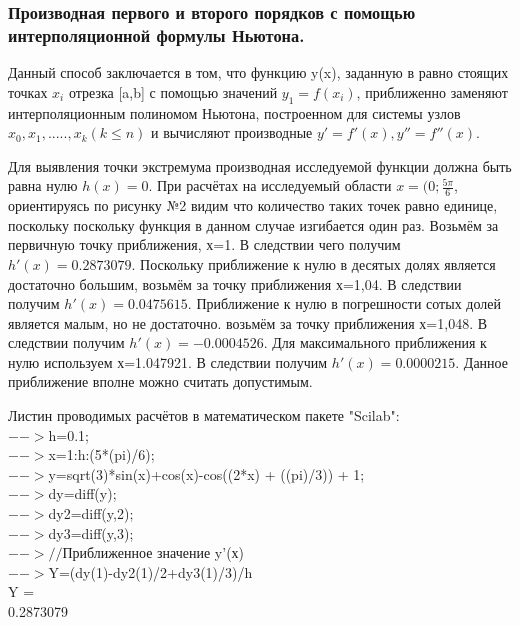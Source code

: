 \documentclass[russian,utf8,nocolumnxxxi,nocolumnxxxii]{eskdtext}
\begin{document}
\subsubsection{Производная первого и второго порядков с помощью интерполяционной формулы Ньютона.}

Данный способ заключается в том, что функцию y(x), заданную в равно стоящих точках $x_i$ отрезка [a,b] с помощью значений $y_1=f(x_i)$, приближенно заменяют интерполяционным полиномом Ньютона,  построенном для системы узлов $x_0,x_1,.....,x_k(k \leqslant n)$ и вычисляют производные $y'=f'(x), y''=f''(x)$.

Для выявления точки экстремума производная исследуемой функции должна быть равна нулю $h(x)=0$. При расчётах на исследуемый области $x=(0;\frac{5\pi}{6}$, ориентируясь по рисунку №2 видим что количество таких точек равно единице, поскольку поскольку функция в данном случае изгибается один раз.
Возьмём за первичную точку приближения, х=1. В следствии чего получим $h'(x)=0.2873079$. Поскольку приближение к нулю в десятых долях является достаточно большим, возьмём за точку приближения х=1,04. В следствии получим $h'(x)=0.0475615$. Приближение к нулю в погрешности сотых долей является малым, но не достаточно. возьмём за точку приближения х=1,048. В следствии получим $h'(x)=- 0.0004526$. Для максимального приближения к нулю используем х=1.047921. В следствии получим $h'(x)=0.0000215$. Данное приближение вполне можно считать допустимым.

Листин проводимых расчётов в математическом пакете "Scilab":\\
$-->$h=0.1;\\

$-->$x=1:h:(5*(pi)/6);\\

$-->$y=sqrt(3)*sin(x)+cos(x)-cos((2*x) + ((pi)/3)) + 1;\\

$-->$dy=diff(y);\\

$-->$dy2=diff(y,2);\\

$-->$dy3=diff(y,3);\\

$-->//$Приближенное значение y’(х)\\

$-->$Y=(dy(1)-dy2(1)/2+dy3(1)/3)/h\\
 Y  =\\

    0.2873079\\
\end{document}
